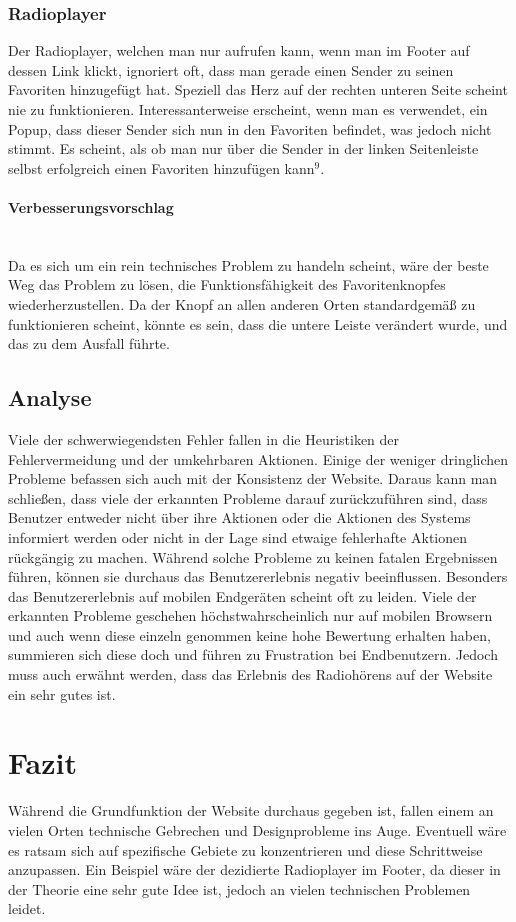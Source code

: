 \documentclass{article}
\newcommand{\paragraphlb}[1]{\paragraph{#1}\mbox{}\\}
\begin{document}
	\subsubsection{Radioplayer}
	Der Radioplayer, welchen man nur aufrufen kann, wenn man im Footer auf dessen Link klickt, ignoriert oft, dass man gerade einen Sender zu seinen Favoriten hinzugefügt hat. Speziell das Herz auf der rechten unteren Seite scheint nie zu funktionieren. Interessanterweise erscheint, wenn man es verwendet, ein Popup, dass dieser Sender sich nun in den Favoriten befindet, was jedoch nicht stimmt. Es scheint, als ob man nur über die Sender in der linken Seitenleiste selbst erfolgreich einen Favoriten hinzufügen kann\hyperref[sec:Anhang9]{$^9$}\label{ssub:radio1}.
	\paragraphlb{Verbesserungsvorschlag}
	Da es sich um ein rein technisches Problem zu handeln scheint, wäre der beste Weg das Problem zu lösen, die Funktionsfähigkeit des Favoritenknopfes wiederherzustellen. Da der Knopf an allen anderen Orten standardgemäß zu funktionieren scheint, könnte es sein, dass die untere Leiste verändert wurde, und das zu dem Ausfall führte.
	\subsection{Analyse}
	Viele der schwerwiegendsten Fehler fallen in die Heuristiken der Fehlervermeidung und der umkehrbaren Aktionen. Einige der weniger dringlichen Probleme befassen sich auch mit der Konsistenz der Website. Daraus kann man schließen, dass viele der erkannten Probleme darauf zurückzuführen sind, dass Benutzer entweder nicht über ihre Aktionen oder die Aktionen des Systems informiert werden oder nicht in der Lage sind etwaige fehlerhafte Aktionen rückgängig zu machen. Während solche Probleme zu keinen fatalen Ergebnissen führen, können sie durchaus das Benutzererlebnis negativ beeinflussen. Besonders das Benutzererlebnis auf mobilen Endgeräten scheint oft zu leiden. Viele der erkannten Probleme geschehen höchstwahrscheinlich nur auf mobilen Browsern und auch wenn diese einzeln genommen keine hohe Bewertung erhalten haben, summieren sich diese doch und führen zu Frustration bei Endbenutzern. Jedoch muss auch erwähnt werden, dass das Erlebnis des Radiohörens auf der Website ein sehr gutes ist.
	\section{Fazit}
	Während die Grundfunktion der Website durchaus gegeben ist, fallen einem an vielen Orten technische Gebrechen und Designprobleme ins Auge. Eventuell wäre es ratsam sich auf spezifische Gebiete zu konzentrieren und diese Schrittweise anzupassen. Ein Beispiel wäre der dezidierte Radioplayer im Footer, da dieser in der Theorie eine sehr gute Idee ist, jedoch an vielen technischen Problemen leidet.
\end{document}
